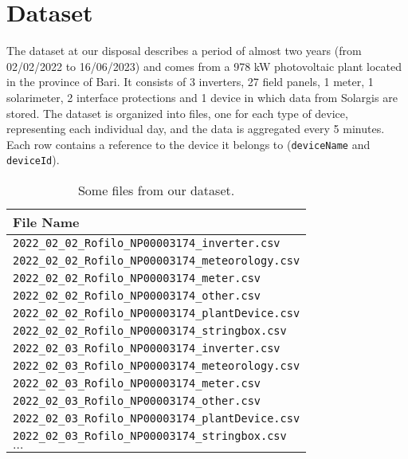 \section{Dataset}

The dataset at our disposal describes a period of almost two years
(from 02/02/2022 to 16/06/2023) and comes from a 978 kW photovoltaic
plant located in the province of Bari. It consists of 3 inverters,
27 field panels, 1 meter, 1 solarimeter, 2 interface protections
and 1  device in which data from Solargis are stored.
The dataset is organized into files, one for each type of device,
representing each individual day, and the data is aggregated
every 5 minutes. Each row contains a reference to the device
it belongs to (\verb|deviceName| and \verb|deviceId|).



\begin{table}[H]
	\begin{center}
		\begin{tabular}[c]{l}
			\hline
			\textbf{File Name}                                  \\
			\hline
			\verb|2022_02_02_Rofilo_NP00003174_inverter.csv|    \\
			\verb|2022_02_02_Rofilo_NP00003174_meteorology.csv| \\
			\verb|2022_02_02_Rofilo_NP00003174_meter.csv|       \\
			\verb|2022_02_02_Rofilo_NP00003174_other.csv|       \\
			\verb|2022_02_02_Rofilo_NP00003174_plantDevice.csv| \\
			\verb|2022_02_02_Rofilo_NP00003174_stringbox.csv|   \\
			\verb|2022_02_03_Rofilo_NP00003174_inverter.csv|    \\
			\verb|2022_02_03_Rofilo_NP00003174_meteorology.csv| \\
			\verb|2022_02_03_Rofilo_NP00003174_meter.csv|       \\
			\verb|2022_02_03_Rofilo_NP00003174_other.csv|       \\
			\verb|2022_02_03_Rofilo_NP00003174_plantDevice.csv| \\
			\verb|2022_02_03_Rofilo_NP00003174_stringbox.csv|   \\
			$\ldots$                                            \\
			\hline
		\end{tabular}
	\end{center}
	\caption{Some files from our dataset.}\label{tab:datasunto}
\end{table}

